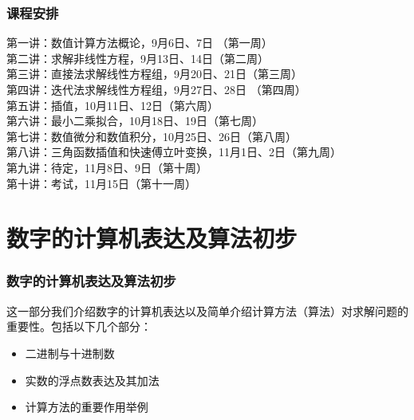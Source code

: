 \documentclass[10pt]{beamer}
\begin{document}
\begin{frame}
\frametitle{课程安排}
第一讲：数值计算方法概论，9月6日、7日 （第一周）\\
第二讲：求解非线性方程，9月13日、14日（第二周） \\
第三讲：直接法求解线性方程组，9月20日、21日（第三周） \\
第四讲：迭代法求解线性方程组，9月27日、28日 （第四周）\\
第五讲：插值，10月11日、12日（第六周）\\
第六讲：最小二乘拟合，10月18日、19日（第七周）\\
第七讲：数值微分和数值积分，10月25日、26日（第八周）\\
第八讲：三角函数插值和快速傅立叶变换，11月1日、2日（第九周）\\
第九讲：待定，11月8日、9日（第十周）\\
第十讲：考试，11月15日（第十一周）\\
\end{frame}





\section{数字的计算机表达及算法初步}


\begin{frame}
\frametitle{数字的计算机表达及算法初步}
这一部分我们介绍数字的计算机表达以及简单介绍计算方法（算法）对求解问题的重要性。包括以下几个部分：
\begin{itemize}
\item 二进制与十进制数
\item 实数的浮点数表达及其加法
\item 计算方法的重要作用举例
\end{itemize}

\end{frame}
\end{document}
